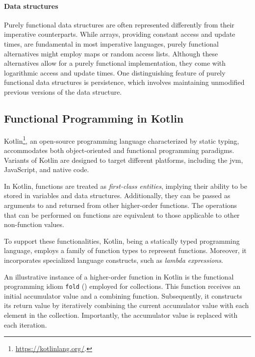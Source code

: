 \paragraph{Data structures}

Purely functional data structures are often represented differently from their imperative counterparts. While arrays, providing constant access and update times, are fundamental in most imperative languages, purely functional alternatives might employ maps or random access lists. Although these alternatives allow for a purely functional implementation, they come with logarithmic access and update times. One distinguishing feature of purely functional data structures is persistence, which involves maintaining unmodified previous versions of the data structure.

\subsection{Functional Programming in Kotlin}

Kotlin\footnote{\url{https://kotlinlang.org/}.}, an open-source programming language characterized by static typing, accommodates both object-oriented and functional programming paradigms. Variants of Kotlin are designed to target different platforms, including the \ac{jvm}, JavaScript, and native code.

In Kotlin, functions are treated as \textit{first-class entities}, implying their ability to be stored in variables and data structures. Additionally, they can be passed as arguments to and returned from other higher-order functions. The operations that can be performed on functions are equivalent to those applicable to other non-function values.

To support these functionalities, Kotlin, being a statically typed programming language, employs a family of function types to represent functions. Moreover, it incorporates specialized language constructs, such as \textit{lambda expressions}.

An illustrative instance of a higher-order function in Kotlin is the functional programming idiom \texttt{fold} ()
employed for collections. This function receives an initial accumulator value and a combining function. Subsequently, it constructs its return value by iteratively combining the current accumulator value with each element in the collection. Importantly, the accumulator value is replaced with each iteration.



